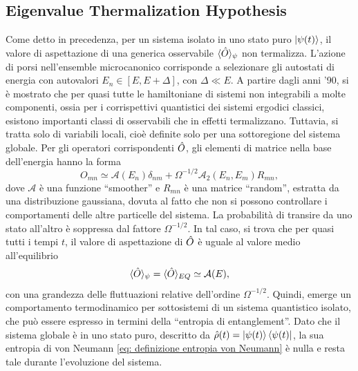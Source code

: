 \subsection{Eigenvalue Thermalization Hypothesis}
Come detto in precedenza, per un sistema isolato in uno stato puro $\ket{\psi(t)}$, il valore di aspettazione di una generica osservabile $\langle \hat{O} \rangle_\psi$ non termalizza. L'azione di porsi nell'ensemble microcanonico corrisponde a selezionare gli autostati di energia con autovalori $E_n \in [E, E + \Delta]$, con $\Delta \ll E$. A partire dagli anni '90, si è mostrato che per quasi tutte le hamiltoniane di sistemi non integrabili a molte componenti, ossia per i corrispettivi quantistici dei sistemi ergodici classici, esistono importanti classi di osservabili che in effetti termalizzano. Tuttavia, si tratta solo di variabili locali, cioè definite solo per una sottoregione del sistema globale. Per gli operatori corrispondenti $\hat{O}$, gli elementi di matrice nella base dell'energia hanno la forma
\begin{equation}
    O_{mn} \simeq \mathcal{A}(E_n)\delta_{nm} + \Omega^{-1/2}\mathcal{A}_2(E_n,E_m)R_{mn},
\end{equation}
dove $\mathcal{A}$ è una funzione ``smoother'' e $R_{mn}$ è una matrice ``random'', estratta da una distribuzione gaussiana, dovuta al fatto che non si possono controllare i comportamenti delle altre particelle del sistema. La probabilità di transire da uno stato all'altro è soppressa dal fattore $\Omega^{-1/2}$. In tal caso, si trova che per quasi tutti i tempi $t$, il valore di aspettazione di $\hat{O}$ è uguale al valore medio all'equilibrio
\begin{equation}
    \langle \hat{O} \rangle_\psi = \langle \hat{O} \rangle_{EQ} \simeq \mathcal{A}(E),
\end{equation}
con una grandezza delle fluttuazioni relative dell'ordine $\Omega^{-1/2}$. Quindi, emerge un comportamento termodinamico per sottosistemi di un sistema quantistico isolato, che può essere espresso in termini della ``entropia di entanglement''. Dato che il sistema globale è in uno stato puro, descritto da $\hat{\rho}(t) = \ket{\psi(t)}\bra{\psi(t)}$, la sua entropia di von Neumann \eqref{eq: definizione entropia von Neumann} è nulla e resta tale durante l'evoluzione del sistema. 

